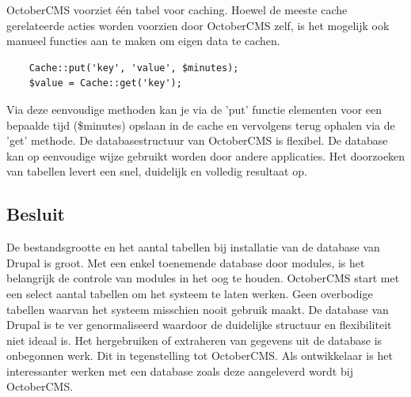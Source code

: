 \noindent
OctoberCMS voorziet één tabel voor caching. Hoewel de meeste cache gerelateerde acties worden voorzien door OctoberCMS zelf, is het mogelijk ook manueel functies aan te maken om eigen data te cachen.

\begin{verbatim}
	Cache::put('key', 'value', $minutes);
    $value = Cache::get('key');  
\end{verbatim}

\noindent
Via deze eenvoudige methoden kan je via de 'put' functie elementen voor een bepaalde tijd (\$minutes) opslaan in de cache en vervolgens terug ophalen via de 'get' methode.
\newline\newline
De databasestructuur van OctoberCMS is flexibel. De database kan op eenvoudige wijze gebruikt worden door andere applicaties. Het doorzoeken van tabellen levert een snel, duidelijk en volledig resultaat op.

\pagebreak

\subsection{Besluit}
De bestandsgrootte en het aantal tabellen bij installatie van de database van Drupal is groot. Met een enkel toenemende database door modules, is het belangrijk de controle van modules in het oog te houden. OctoberCMS start met een select aantal tabellen om het systeem te laten werken. Geen overbodige tabellen waarvan het systeem misschien nooit gebruik maakt. 
\newline\newline
De database van Drupal is te ver genormaliseerd waardoor de duidelijke structuur en flexibiliteit niet ideaal is. Het hergebruiken of extraheren van gegevens uit de database is onbegonnen werk. Dit in tegenstelling tot OctoberCMS. Als ontwikkelaar is het interessanter werken met een database zoals deze aangeleverd wordt bij OctoberCMS.